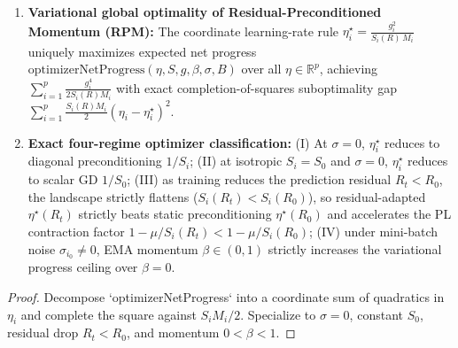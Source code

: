 \begin{lemma}
\begin{enumerate}
\item \textbf{Variational global optimality of Residual-Preconditioned Momentum (RPM):} The coordinate learning-rate rule $\eta_i^\star = \frac{g_i^2}{S_i(R)\,M_i}$ uniquely maximizes expected net progress $\mathrm{optimizerNetProgress}(\eta, S, g, \beta, \sigma, B)$ over all $\eta\in\mathbb{R}^p$, achieving $\sum_{i=1}^p \frac{g_i^4}{2 S_i(R) M_i}$ with exact completion-of-squares suboptimality gap $\sum_{i=1}^p \frac{S_i(R) M_i}{2}(\eta_i - \eta_i^\star)^2$.
\item \textbf{Exact four-regime optimizer classification:} (I) At $\sigma = 0$, $\eta_i^\star$ reduces to diagonal preconditioning $1/S_i$; (II) at isotropic $S_i = S_0$ and $\sigma = 0$, $\eta_i^\star$ reduces to scalar GD $1/S_0$; (III) as training reduces the prediction residual $R_t < R_0$, the landscape strictly flattens ($S_i(R_t) < S_i(R_0)$), so residual-adapted $\eta^\star(R_t)$ strictly beats static preconditioning $\eta^\star(R_0)$ and accelerates the PL contraction factor $1 - \mu/S_i(R_t) < 1 - \mu/S_i(R_0)$; (IV) under mini-batch noise $\sigma_{i_0}\ne 0$, EMA momentum $\beta\in(0,1)$ strictly increases the variational progress ceiling over $\beta=0$.
\end{enumerate}
\end{lemma}
\begin{proof}
\leanok
Decompose `optimizerNetProgress` into a coordinate sum of quadratics in $\eta_i$ and complete the square against $S_i M_i / 2$. Specialize to $\sigma=0$, constant $S_0$, residual drop $R_t < R_0$, and momentum $0 < \beta < 1$.
\end{proof}

